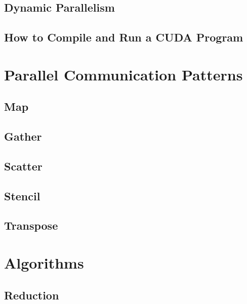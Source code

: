 \documentclass[12px,oz]{report}
\theoremstyle{indented}
\theoremstyle{indented}
\def \cuda {CUDA}
\begin{document}
	\section{Dynamic Parallelism}
	\label{sec-pm-dynamic}
	
	
	\section{How to Compile and Run a \cuda{} Program}
	\label{sec-pm-compile-run}
	


\chapter{Parallel Communication Patterns}
\label{ch-patterns}

	
	\section{Map}
	\label{sec-map}
	
	
	\section{Gather}
	\label{sec-gather}
	
	
	\section{Scatter}
	\label{sec-scatter}
	
	
	\section{Stencil}
	\label{sec-stencil}
	
	
	\section{Transpose}
	\label{sec-transpose}
	
	
\chapter{Algorithms}
\label{ch:algorithms}


	\section{Reduction}
	\label{sec:al_reduction}
	
	
\end{document}

